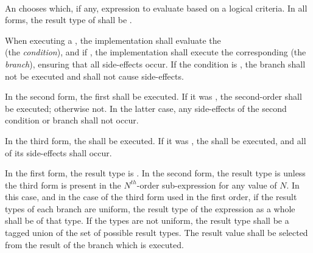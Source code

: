 




\begin{grammar}
 \\
	  \\
	    \\
	    \\

 \\
	\terminal{(}  \terminal{)}  \\
\end{grammar}

\specsubsubitem
An  chooses which, if any, expression to evaluate
based on a logical criteria. In all forms, the result type of
 shall be .

\specsubsubitem
When executing a , the implementation shall
evaluate the \\  (the \textit{condition}), and
if , the implementation shall execute the corresponding
 (the \textit{branch}), ensuring that all
side-effects occur. If the condition is , the branch shall not
be executed and shall not cause side-effects.

\specsubsubitem
In the second form, the first  shall be
executed. If it was , the second-order
 shall be executed; otherwise not. In the latter
case, any side-effects of the second condition or branch shall not occur.

\specsubsubitem
In the third form, the  shall be executed. If
it was , the  shall be
executed, and all of its side-effects shall occur.

\specsubsubitem
In the first form, the result type is . In the second form, the
result type is  unless the third form is present in the
$N^{th}$-order sub-expression for any value of $N$. In this case, and in the
case of the third form used in the first order, if the result types of each
branch are uniform, the result type of the expression as a whole shall be of
that type. If the types are not uniform, the result type shall be a tagged
union of the set of possible result types. The result value shall be selected
from the result of the branch which is executed.

